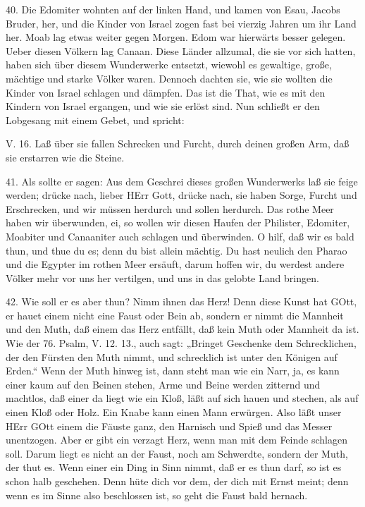 40. Die Edomiter wohnten auf der linken Hand, und kamen von Esau, Jacobs Bruder, her, und die Kinder von Israel zogen fast bei vierzig Jahren um ihr Land her. Moab lag etwas weiter gegen Morgen. Edom war hierwärts besser gelegen. Ueber diesen Völkern lag Canaan. Diese Länder allzumal, die sie vor sich hatten, haben sich über diesem Wunderwerke entsetzt, wiewohl es gewaltige, große, mächtige und starke Völker waren. Dennoch dachten sie, wie sie wollten die Kinder von Israel schlagen und dämpfen. Das ist die That, wie es mit den Kindern von Israel ergangen, und wie sie erlöst sind. Nun schließt er den Lobgesang mit einem Gebet, und spricht:

\begin{schriftzitat}
V. 16. Laß über sie fallen Schrecken und Furcht, durch deinen großen Arm, daß sie erstarren wie die Steine.
\end{schriftzitat}

41. Als sollte er sagen: Aus dem Geschrei dieses großen Wunderwerks laß sie feige werden; drücke nach, lieber HErr Gott, drücke nach, sie haben Sorge, Furcht und Erschrecken, und wir müssen herdurch und sollen herdurch. Das rothe Meer haben wir überwunden, ei, so wollen wir diesen Haufen der Philister, Edomiter, Moabiter und Canaaniter auch schlagen und überwinden. O hilf, daß wir es bald thun, und thue du es; denn du bist allein mächtig. Du hast neulich den Pharao und die Egypter im rothen Meer ersäuft, darum hoffen wir, du werdest andere Völker mehr vor uns her vertilgen, und uns in das gelobte Land bringen.

42. Wie soll er es aber thun? Nimm ihnen das Herz! Denn diese Kunst hat GOtt, er hauet einem nicht eine Faust oder Bein ab, sondern er nimmt die Mannheit und den Muth, daß einem das Herz entfällt, daß kein Muth oder Mannheit da ist. Wie der 76. Psalm, V. 12. 13., auch sagt: „Bringet Geschenke dem Schrecklichen, der den Fürsten den Muth nimmt, und schrecklich ist unter den Königen auf Erden.“ Wenn der Muth hinweg ist, dann steht man wie ein Narr, ja, es kann einer kaum auf den Beinen stehen, Arme und Beine werden zitternd und machtlos, daß einer da liegt wie ein Kloß, läßt auf sich hauen und stechen, als auf einen Kloß oder Holz. Ein Knabe kann einen Mann erwürgen. Also läßt unser HErr GOtt einem die Fäuste ganz, den Harnisch und Spieß und das Messer unentzogen. Aber er gibt ein verzagt Herz, wenn man mit dem Feinde schlagen soll. Darum liegt es nicht an der Faust, noch am Schwerdte, sondern der Muth, der thut es. Wenn einer ein Ding in Sinn nimmt, daß er es thun darf, so ist es schon halb geschehen. Denn hüte dich vor dem, der dich mit Ernst meint; denn wenn es im Sinne also beschlossen ist, so geht die Faust bald hernach.

